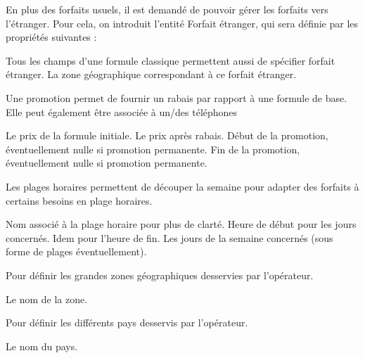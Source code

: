 En plus des forfaits usuels, il est demandé de pouvoir gérer les forfaits vers l'étranger. Pour cela, on introduit l'entité \og Forfait étranger\fg, qui sera définie par les propriétés suivantes :
\begin{multicols}{2}
  \begin{itemize}
    Tous les champs d'une formule \og classique\fg{} permettent aussi de spécifier forfait étranger.
    La zone géographique correspondant à ce forfait étranger.
  \end{itemize}
\end{multicols}

Une promotion permet de fournir un rabais par rapport à une formule de base. Elle peut également être associée à un/des téléphones
\begin{multicols}{2}
  \begin{itemize}
    Le prix de la formule initiale.
    Le prix après rabais.
    Début de la promotion, éventuellement nulle si promotion \og permanente\fg.
    Fin de la promotion, éventuellement nulle si promotion \og permanente\fg.
  \end{itemize}
\end{multicols}

Les plages horaires permettent de découper la semaine pour adapter des forfaits à certains besoins en plage horaires.
\begin{multicols}{2}
  \begin{itemize}
    Nom associé à la plage horaire pour plus de clarté.
    Heure de début pour les jours concernés.
    Idem pour l'heure de fin.
    Les jours de la semaine concernés (sous forme de plages éventuellement).
  \end{itemize}
\end{multicols}

Pour définir les grandes zones géographiques desservies par l'opérateur.
\begin{multicols}{2}
  \begin{itemize}
    Le nom de la zone.
  \end{itemize}
\end{multicols}

Pour définir les différents pays desservis par l'opérateur.
\begin{multicols}{2}
  \begin{itemize}
    Le nom du pays.
  \end{itemize}
\end{multicols}

